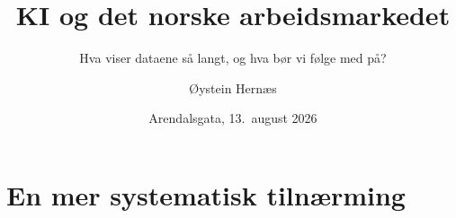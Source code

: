 \documentclass[aspectratio=169,11pt]{beamer}
\title{KI og det norske arbeidsmarkedet}
\subtitle{Hva viser dataene så langt, og hva bør vi følge med på?}
\author{Øystein Hernæs}
\institute{Frischsenteret \and kiindeksen.no}
\date{Arendalsgata, 13.\ august 2026}
\begin{document}
\maketitle




\section{En mer systematisk tilnærming}



\end{document}
